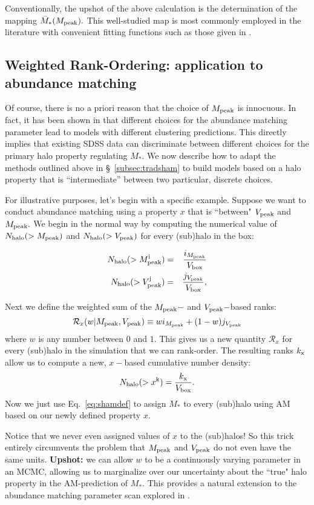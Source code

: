 \documentclass[usenatbib,usegraphicx,letterpaper]{mn2e}
\newcommand{\Nhalo}{N_{\rm halo}}
\newcommand{\mpeak}{M_{\rm peak}}
\newcommand{\vpeak}{V_{\rm peak}}
\newcommand{\beq}{\begin{equation}}
\newcommand{\eeq}{\end{equation}}
\newcommand{\mstar}{M_{\ast}}
\begin{document}
Conventionally, the upshot of the above calculation is the determination of the mapping $\bar{M}_{\ast}(\mpeak).$ This well-studied map is most commonly employed in the literature with convenient fitting functions such as those given in \citet{behroozi10,moster10,kravtsov13}. 

\subsection{Weighted Rank-Ordering: application to abundance matching}
\label{subsec:gensham}

Of course, there is no a priori reason that the choice of $\mpeak$ is innocuous. In fact, it has been shown in \citet{reddick12} that different choices for the abundance matching parameter lead to models with different clustering predictions. This directly implies that existing SDSS data can discriminate between different choices for the primary halo property regulating $\mstar.$ We now describe how to adapt the methods outlined above in \S~\ref{subsec:tradsham} to build models based on a halo property that is ``intermediate'' between two particular, discrete choices. 

For illustrative purposes, let's begin with a specific example. Suppose we want to conduct abundance matching using a property $x$ that is ``between" $\vpeak$ and $\mpeak.$ We begin in the normal way by computing the numerical value of $\Nhalo(>\mpeak)$ and $\Nhalo(>\vpeak)$ for every (sub)halo in the box:

\begin{eqnarray*}
\Nhalo(>\mpeak^{\rm i}) & = & \frac{i_{\mpeak}}{V_{\rm box}} \\
\Nhalo(>\vpeak^{\rm j}) & = & \frac{j_{\vpeak}}{V_{\rm box}},
\end{eqnarray*}

 Next we define the weighted sum of the $\mpeak-$ and $\vpeak-$based ranks:
\beq
\mathcal{R}_{x}(w | \mpeak,\vpeak) \equiv w i_{\mpeak} + (1-w)j_{\vpeak}
\eeq
where $w$ is any number between $0$ and $1.$ This gives us a new quantity $\mathcal{R}_{x}$ for every (sub)halo in the simulation that we can rank-order. The resulting ranks $k_{\rm x}$ allow us to compute a new, $x-$based cumulative number density:
\beq
\Nhalo(>x^{\rm k})  =  \frac{k_{\rm x}}{V_{\rm box}}. 
\eeq
Now we just use Eq.~\ref{eq:shamdef} to assign $\mstar$ to every (sub)halo using AM based on our newly defined property $x.$ 

Notice that we never even assigned values of $x$ to the (sub)halos! So this trick entirely circumvents the problem that $\mpeak$ and $\vpeak$ do not even have the same units. {\bf Upshot:} we can allow $w$ to be a continuously varying parameter in an MCMC, allowing us to  marginalize over our uncertainty about the ``true" halo property in the AM-prediction of $\mstar.$ This provides a natural extension to the abundance matching parameter scan explored in \citet{reddick12}. 
\end{document}
